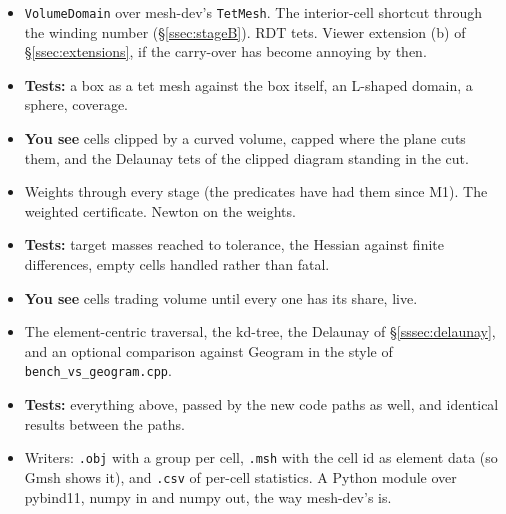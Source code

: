 \documentclass[11pt,a4paper]{article}
\newcommand{\code}[1]{\texttt{#1}}          %
\newcommand{\secref}[1]{\S\ref{#1}}
\begin{document}
\begin{itemize}
\item \code{VolumeDomain} over mesh-dev's \code{TetMesh}. The interior-cell shortcut through the
  winding number (\secref{ssec:stageB}). RDT tets. Viewer extension (b) of
  \secref{ssec:extensions}, if the carry-over has become annoying by then.
\item \textbf{Tests:} a box as a tet mesh against the box itself, an L-shaped domain, a sphere,
  coverage.
\item \textbf{You see} cells clipped by a curved volume, capped where the plane cuts them, and the
  Delaunay tets of the clipped diagram standing in the cut.
\end{itemize}

\begin{itemize}
\item Weights through every stage (the predicates have had them since M1). The weighted
  certificate. Newton on the weights.
\item \textbf{Tests:} target masses reached to tolerance, the Hessian against finite differences,
  empty cells handled rather than fatal.
\item \textbf{You see} cells trading volume until every one has its share, live.
\end{itemize}

\begin{itemize}
\item The element-centric traversal, the kd-tree, the Delaunay of \secref{sssec:delaunay}, and an
  optional comparison against Geogram in the style of \code{bench\_vs\_geogram.cpp}.
\item \textbf{Tests:} everything above, passed by the new code paths as well, and identical
  results between the paths.
\end{itemize}

\begin{itemize}
\item Writers: \code{.obj} with a group per cell, \code{.msh} with the cell id as element data (so
  Gmsh shows it), and \code{.csv} of per-cell statistics. A Python module over pybind11, numpy in
  and numpy out, the way mesh-dev's is.
\end{itemize}

\end{document}
